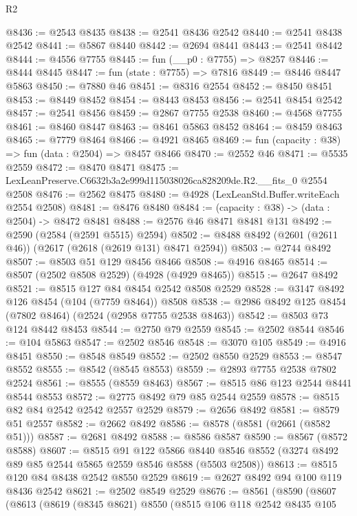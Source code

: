 \begin{lexlean}{R2}
\begin{coremodule}
@8436 := @2543 @8435
@8438 := @2541 @8436 @2542
@8440 := @2541 @8438 @2542
@8441 := @5867 @8440
@8442 := @2694 @8441
@8443 := @2541 @8442
@8444 := @4556 @7755
@8445 := fun (__p0 : @7755) => @8257
@8446 := @8444 @8445
@8447 := fun (state : @7755) => @7816
@8449 := @8446 @8447 @5863
@8450 := @7880 @46
@8451 := @8316 @2554
@8452 := @8450 @8451
@8453 := @8449 @8452
@8454 := @8443 @8453
@8456 := @2541 @8454 @2542
@8457 := @2541 @8456
@8459 := @2867 @7755 @2538
@8460 := @4568 @7755
@8461 := @8460 @8447
@8463 := @8461 @5863 @8452
@8464 := @8459 @8463
@8465 := @7779 @8464
@8466 := @4921 @8465
@8469 := fun (capacity : @38) => fun (data : @2504) => @8457 @8466
@8470 := @2552 @46
@8471 := @5535 @2559
@8472 := @8470 @8471
@8475 := LexLeanPreserve.C6632b3a2e999d115038026ca828209de.R2.__fits_0 @2554 @2508
@8476 := @2562 @8475
@8480 := @4928 (LexLeanStd.Buffer.writeEach @2554 @2508)
@8481 := @8476 @8480
@8484 := (capacity : @38) -> (data : @2504) -> @8472 @8481
@8488 := @2576 @46 @8471 @8481 @131
@8492 := @2590 (@2584 (@2591 @5515) @2594)
@8502 := @8488 @8492 (@2601 (@2611 @46)) (@2617 (@2618 (@2619 @131) @8471 @2594))
@8503 := @2744 @8492
@8507 := @8503 @51 @129 @8456 @8466
@8508 := @4916 @8465
@8514 := @8507 (@2502 @8508 @2529) (@4928 (@4929 @8465))
@8515 := @2647 @8492
@8521 := @8515 @127 @84 @8454 @2542 @8508 @2529
@8528 := @3147 @8492 @126 @8454 (@104 (@7759 @8464)) @8508
@8538 := @2986 @8492 @125 @8454 (@7802 @8464) (@2524 (@2958 @7755 @2538 @8463))
@8542 := @8503 @73 @124 @8442 @8453
@8544 := @2750 @79 @2559
@8545 := @2502 @8544
@8546 := @104 @5863
@8547 := @2502 @8546
@8548 := @3070 @105
@8549 := @4916 @8451
@8550 := @8548 @8549
@8552 := @2502 @8550 @2529
@8553 := @8547 @8552
@8555 := @8542 (@8545 @8553)
@8559 := @2893 @7755 @2538 @7802 @2524
@8561 := @8555 (@8559 @8463)
@8567 := @8515 @86 @123 @2544 @8441 @8544 @8553
@8572 := @2775 @8492 @79 @85 @2544 @2559
@8578 := @8515 @82 @84 @2542 @2542 @2557 @2529
@8579 := @2656 @8492
@8581 := @8579 @51 @2557
@8582 := @2662 @8492
@8586 := @8578 (@8581 (@2661 (@8582 @51)))
@8587 := @2681 @8492
@8588 := @8586 @8587
@8590 := @8567 (@8572 @8588)
@8607 := @8515
    @91
    @122
    @5866
    @8440
    @8546
    @8552
    (@3274 @8492 @89 @85 @2544 @5865 @2559 @8546 @8588 (@5503 @2508))
@8613 := @8515 @120 @84 @8438 @2542 @8550 @2529
@8619 := @2627 @8492 @94 @100 @119 @8436 @2542
@8621 := @2502 @8549 @2529
@8676 := @8561
    (@8590
      (@8607
        (@8613
          (@8619
            (@8345 @8621)
            @8550
            (@8515
              @106
              @118
              @2542
              @8435
              @105

\end{coremodule}
\end{lexlean}
